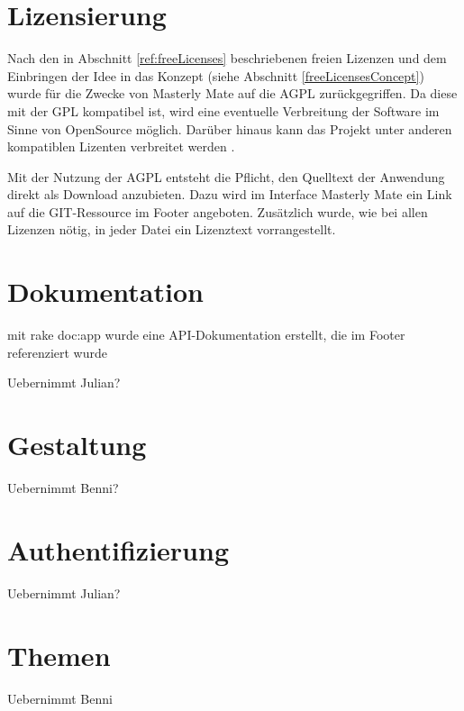 \section{Lizensierung}
Nach den in Abschnitt \ref{ref:freeLicenses} beschriebenen freien Lizenzen und
dem Einbringen der Idee in das Konzept (siehe Abschnitt
\ref{freeLicensesConcept}) wurde für die Zwecke von Masterly Mate auf die
\ac{AGPL} zurückgegriffen. Da diese mit der \ac{GPL} kompatibel ist, wird
eine eventuelle Verbreitung der Software im Sinne von OpenSource möglich.
Darüber hinaus kann das Projekt unter anderen kompatiblen Lizenten verbreitet
werden \cite{fsf:2007}.

Mit der Nutzung der AGPL entsteht die Pflicht, den Quelltext der Anwendung
direkt als Download anzubieten. Dazu wird im Interface Masterly Mate
ein Link auf die GIT-Ressource im Footer angeboten. Zusätzlich wurde, wie bei
allen Lizenzen nötig, in jeder Datei ein Lizenztext vorrangestellt.

\section{Dokumentation}
\begin{k}
mit rake doc:app wurde eine API-Dokumentation erstellt, die im Footer
referenziert wurde

Uebernimmt Julian?
\end{k}

\section{Gestaltung}
\begin{k}
Uebernimmt Benni?
\end{k}

\section{Authentifizierung}
\begin{k}
Uebernimmt Julian?
\end{k}

\section{Themen}
\begin{k}
Uebernimmt Benni
\end{k}